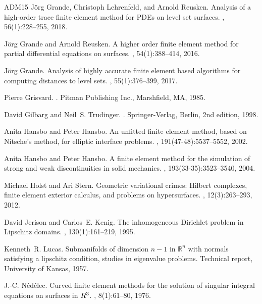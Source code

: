 \documentclass{amsart}
\begin{document}
\begin{thebibliography}{ADM{\etalchar{+}}15}
J\"{o}rg Grande, Christoph Lehrenfeld, and Arnold Reusken.
\newblock Analysis of a high-order trace finite element method for {PDE}s on
  level set surfaces.
, 56(1):228--255, 2018.

J\"{o}rg Grande and Arnold Reusken.
\newblock A higher order finite element method for partial differential
  equations on surfaces.
, 54(1):388--414, 2016.

J\"org Grande.
\newblock Analysis of highly accurate finite element based algorithms for
  computing distances to level sets.
, 55(1):376--399, 2017.

Pierre Grisvard.
.
\newblock Pitman Publishing Inc., Marshfield, MA, 1985.

David Gilbarg and Neil~S. Trudinger.
.
\newblock Springer-Verlag, Berlin, 2nd edition, 1998.

Anita Hansbo and Peter Hansbo.
\newblock An unfitted finite element method, based on {N}itsche's method, for
  elliptic interface problems.
, 191(47-48):5537--5552,
  2002.

Anita Hansbo and Peter Hansbo.
\newblock A finite element method for the simulation of strong and weak
  discontinuities in solid mechanics.
, 193(33-35):3523--3540,
  2004.

Michael Holst and Ari Stern.
\newblock Geometric variational crimes: {H}ilbert complexes, finite element
  exterior calculus, and problems on hypersurfaces.
, 12(3):263--293, 2012.

David Jerison and Carlos~E. Kenig.
\newblock The inhomogeneous {D}irichlet problem in {L}ipschitz domains.
, 130(1):161--219, 1995.

Kenneth~R. Lucas.
\newblock Submanifolds of dimension $n-1$ in $\mathbb{R}^n$ with normals
  satisfying a lipschitz condition, studies in eigenvalue problems.
\newblock Technical report, University of Kansas, 1957.

J.-C. N{\'e}d{\'e}lec.
\newblock Curved finite element methods for the solution of singular integral
  equations on surfaces in {$R\sp{3}$}.
, 8(1):61--80, 1976.


\end{thebibliography}
\end{document}
